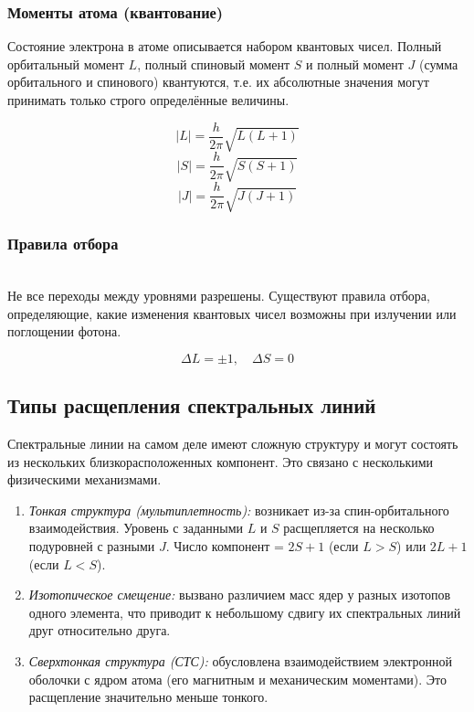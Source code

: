 \documentclass[12pt,a5paper,titlepage, main = russian]{article}
\begin{document}
\subsubsection{Моменты атома (квантование)} 
Состояние электрона в атоме описывается набором квантовых чисел. Полный орбитальный момент \(L\), полный спиновый момент \(S\) и полный момент \(J\) (сумма орбитального и спинового) квантуются, т.е. их абсолютные значения могут принимать только строго определённые величины.

    \begin{equation}
        |L| = \frac{h}{2\pi}\sqrt{L(L+1)}
    \end{equation}
    \begin{equation}
        |S| = \frac{h}{2\pi}\sqrt{S(S+1)}
    \end{equation}
    \begin{equation}
        |J| = \frac{h}{2\pi}\sqrt{J(J+1)}
    \end{equation}      
\subsubsection{Правила отбора} \\
Не все переходы между уровнями разрешены. Существуют правила отбора, определяющие, какие изменения квантовых чисел возможны при излучении или поглощении фотона.

\begin{equation}
    \Delta L = \pm 1,\quad \Delta S = 0 
\end{equation}


\subsection{Типы расщепления спектральных линий} 
Спектральные линии на самом деле имеют сложную структуру и могут состоять из нескольких близкорасположенных компонент. Это связано с несколькими физическими механизмами.

\begin{enumerate}
    \item \textit{Тонкая структура (мультиплетность):} возникает из-за спин-орбитального взаимодействия. Уровень с заданными \(L\) и \(S\) расщепляется на несколько подуровней с разными \(J\). Число компонент = \(2S+1\) (если \(L > S\)) или \(2L+1\) (если \(L < S\)).
    \item \textit{Изотопическое смещение:} вызвано различием масс ядер у разных изотопов одного элемента, что приводит к небольшому сдвигу их спектральных линий друг относительно друга.
    \item \textit{Сверхтонкая структура (СТС):} обусловлена взаимодействием электронной оболочки с ядром атома (его магнитным и механическим моментами). Это расщепление значительно меньше тонкого.
\end{enumerate}
\end{document}
